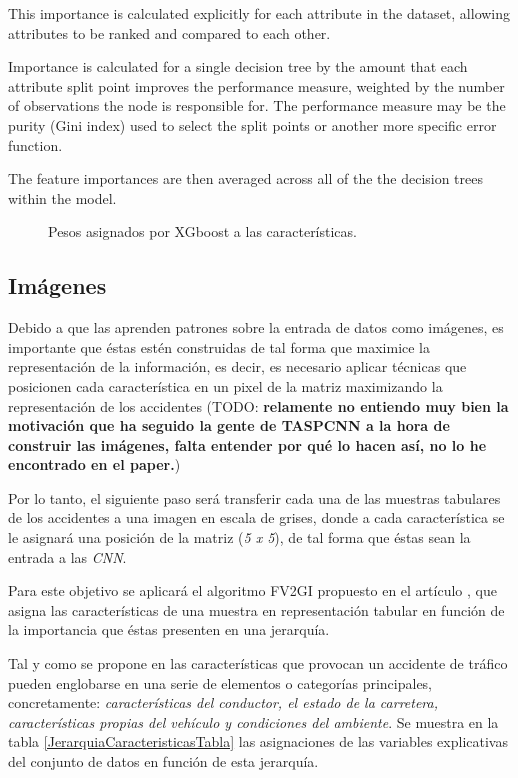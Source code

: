         This importance is calculated explicitly for each attribute in the dataset, allowing attributes to be ranked and compared to each other.

        Importance is calculated for a single decision tree by the amount that each attribute split point improves the performance measure, weighted by the number of observations the node is responsible for. The performance measure may be the purity (Gini index) used to select the split points or another more specific error function.

        The feature importances are then averaged across all of the the decision trees within the model.

        \begin{figure}[H]
            \centering
            
            \caption{Pesos asignados por XGboost a las características.}
            \label{FeatureWeightsImage}
         \end{figure}


    \subsection{Imágenes}


        Debido a que las  aprenden patrones sobre la entrada de datos como imágenes, es importante que éstas estén construidas de tal forma que maximice la representación de la información, es decir, es necesario aplicar técnicas que posicionen cada característica en un pixel de la matriz maximizando la representación de los accidentes (TODO: \textbf{relamente no entiendo muy bien la motivación que ha seguido la gente de TASPCNN a la hora de construir las imágenes, falta entender por qué lo hacen así, no lo he encontrado en el paper.})

        Por lo tanto, el siguiente paso será transferir cada una de las muestras tabulares de los accidentes a una imagen en escala de grises, donde a cada característica se le asignará una posición de la matriz (\textit{5 x 5}), de tal forma que éstas sean la entrada a las \textit{CNN}.

        Para este objetivo se aplicará el algoritmo FV2GI propuesto en el artículo \cite{TASPCNN}, que asigna las características de una muestra en representación tabular en función de la importancia que éstas presenten en una jerarquía.

        Tal y como se propone en \cite{JerarquiaImagenes} las características que provocan un accidente de tráfico pueden englobarse en una serie de elementos o categorías principales, concretamente: \textit{características del conductor, el estado de la carretera, características propias del vehículo y condiciones del ambiente}. Se muestra en la tabla \ref{JerarquiaCaracteristicasTabla} las asignaciones de las variables explicativas del conjunto de datos en función de esta jerarquía.


